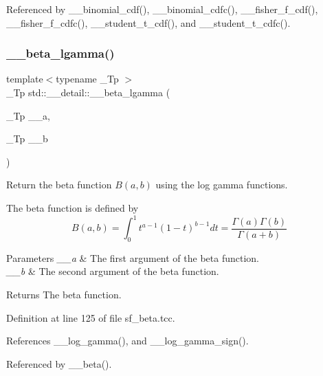 Referenced by \+\_\+\+\_\+binomial\+\_\+cdf(), \+\_\+\+\_\+binomial\+\_\+cdfc(), \+\_\+\+\_\+fisher\+\_\+f\+\_\+cdf(), \+\_\+\+\_\+fisher\+\_\+f\+\_\+cdfc(), \+\_\+\+\_\+student\+\_\+t\+\_\+cdf(), and \+\_\+\+\_\+student\+\_\+t\+\_\+cdfc().

\mbox{\label{namespacestd_1_1____detail_ac4f233100713779d93e4eee7665bd0a5}} 
\subsubsection{\texorpdfstring{\+\_\+\+\_\+beta\+\_\+lgamma()}{\_\_beta\_lgamma()}}
{\footnotesize\ttfamily template$<$typename \+\_\+\+Tp $>$ \\
\+\_\+\+Tp std\+::\+\_\+\+\_\+detail\+::\+\_\+\+\_\+beta\+\_\+lgamma (\begin{DoxyParamCaption}\item[{\+\_\+\+Tp}]{\+\_\+\+\_\+a,  }\item[{\+\_\+\+Tp}]{\+\_\+\+\_\+b }\end{DoxyParamCaption})}



Return the beta function $B(a,b)$ using the log gamma functions. 

The beta function is defined by \[ B(a,b) = \int_0^1 t^{a - 1} (1 - t)^{b - 1} dt = \frac{\Gamma(a)\Gamma(b)}{\Gamma(a+b)} \]


\begin{DoxyParams}{Parameters}
{\em \+\_\+\+\_\+a} & The first argument of the beta function. \\
\hline
{\em \+\_\+\+\_\+b} & The second argument of the beta function. \\
\hline
\end{DoxyParams}
\begin{DoxyReturn}{Returns}
The beta function. 
\end{DoxyReturn}


Definition at line 125 of file sf\+\_\+beta.\+tcc.



References \+\_\+\+\_\+log\+\_\+gamma(), and \+\_\+\+\_\+log\+\_\+gamma\+\_\+sign().



Referenced by \+\_\+\+\_\+beta().

